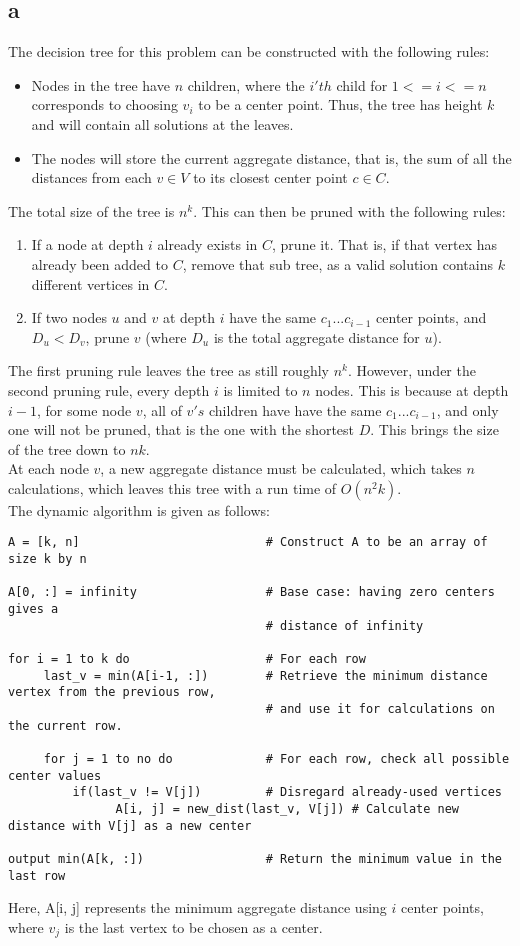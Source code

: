 \documentclass[letterpaper,notitlepage,twoside]{article}
\begin{document}
\subsection*{a}
The decision tree for this problem can be constructed with the following rules:
\begin{itemize}
\item Nodes in the tree have $n$ children, where the $i'th$ child for $1<=i<=n$ corresponds to choosing $v_i$ to be a center point. Thus, the tree has height $k$ and will contain all solutions at the leaves.
\item The nodes will store the current aggregate distance, that is, the sum of all the distances from each $v\in V$ to its closest center point $c\in C$.
\end{itemize}
The total size of the tree is $n^k$. This can then be pruned with the following rules:
\begin{enumerate}
\item If a node at depth $i$ already exists in $C$, prune it. That is, if that vertex has already been added to $C$, remove that sub tree, as a valid solution contains $k$ different vertices in $C$.
\item If two nodes $u$ and $v$ at depth $i$ have the same $c_1...c_{i-1}$ center points, and $D_u < D_v$, prune $v$ (where $D_u$ is the total aggregate distance for $u$).
\end {enumerate}
The first pruning rule leaves the tree as still roughly $n^k$. However, under the second pruning rule, every depth $i$ is limited to $n$ nodes. This is because at depth $i-1$, for some node $v$, all of $v's$ children have have the same $c_1...c_{i-1}$, and only one will not be pruned, that is the one with the shortest $D$. This brings the size of the tree down to $nk$.\\
At each node $v$, a new aggregate distance must be calculated, which takes $n$ calculations, which leaves this tree with a run time of $O(n^2 k)$. \\
The dynamic algorithm is given as follows:
\begin{verbatim}
A = [k, n]                          # Construct A to be an array of size k by n

A[0, :] = infinity                  # Base case: having zero centers gives a
                                    # distance of infinity

for i = 1 to k do                   # For each row
     last_v = min(A[i-1, :])        # Retrieve the minimum distance vertex from the previous row,
                                    # and use it for calculations on the current row.

     for j = 1 to no do             # For each row, check all possible center values
         if(last_v != V[j])         # Disregard already-used vertices
               A[i, j] = new_dist(last_v, V[j]) # Calculate new distance with V[j] as a new center

output min(A[k, :])                 # Return the minimum value in the last row

\end{verbatim}
Here, A[i, j] represents the minimum aggregate distance using $i$ center points, where $v_j$ is the last vertex to be chosen as a center.
\end{document}
